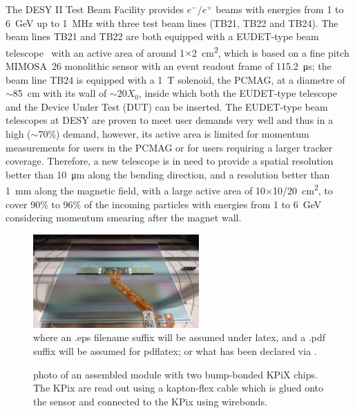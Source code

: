 \documentclass[conference]{IEEEtran}
\def\lycoris{\textsc{Lycoris }}%
\begin{document}
The DESY II Test Beam Facility\cite{desytbf}
provides $e^-/e^+$ beams with energies from 1 to \SI{6}{\GeV} up to \SI{1}{\MHz}
with three test beam lines (TB21, TB22 and TB24).
The beam lines TB21 and TB22 are both equipped with a EUDET-type beam telescope~\cite{eudet}
with an active area of around 1$\times$\SI{2}{\square\centi\metre},
which is based on a fine pitch \uppercase{mimosa}~26 monolithic sensor with an event readout frame of \SI{115.2}{\micro\second};
the beam line TB24 is equipped with a \SI{1}{\tesla} solenoid, the PCMAG, at a diametre of $\sim$\SI{85}{\centi\metre} with its wall of $\sim20X_0$,
inside which both the EUDET-type telescope and the Device Under Test (DUT) can be inserted.
The EUDET-type beam telescopes at DESY are proven to meet user demands very well and thus in a high ($\sim$70\%) demand,
however, its active area is limited for momentum measurements for users in the PCMAG or for users requiring a larger tracker coverage.
Therefore, a new telescope is in need to provide a spatial resolution better than \SI{10}{\micro\metre} along the bending direction,
and a resolution better than \SI{1}{\milli\metre} along the magnetic field,
with a large active area of 10$\times$10/\SI{20}{\square\centi\metre},
to cover 90\% to 96\% of the incoming particles with energies from 1 to \SI{6}{\GeV} considering momentum smearing after the magnet wall.

\begin{figure}[!t]
\centering
\includegraphics[width=2.5in]{pics/sensor_module1.jpg}\\
where an .eps filename suffix will be assumed under latex,
and a .pdf suffix will be assumed for pdflatex; or what has been declared
via \DeclareGraphicsExtensions.
\caption{photo of an assembled module with two bump-bonded KPiX chips.
The KPix are read out using a kapton-flex cable which is glued onto the sensor and connected to the KPix using wirebonds.}
\label{fig:1}
\end{figure}

\end{document}
